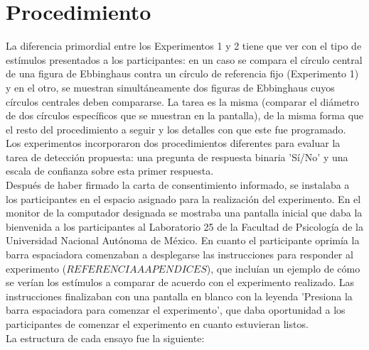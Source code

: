 \section{Procedimiento}

La diferencia primordial entre los Experimentos 1 y 2 tiene que ver con el tipo de estímulos presentados a los participantes: en un caso se compara el círculo central de una figura de Ebbinghaus contra un círculo de referencia fijo (Experimento 1) y en el otro, se muestran simultáneamente dos figuras de Ebbinghaus cuyos círculos centrales deben compararse. La tarea es la misma (comparar el diámetro de dos círculos específicos que se muestran en la pantalla), de la misma forma que el resto del procedimiento a seguir y los detalles con que este fue programado.\\

Los experimentos incorporaron dos procedimientos diferentes para evaluar la tarea de detección propuesta: una pregunta de respuesta binaria 'Sí/No' y una escala de confianza sobre esta primer respuesta.\\

Después de haber firmado la carta de consentimiento informado, se instalaba a los participantes en el espacio asignado para la realización del experimento. En el monitor de la computador designada se mostraba una pantalla inicial que daba la bienvenida a los participantes al Laboratorio 25 de la Facultad de Psicología de la Universidad Nacional Autónoma de México. En cuanto el participante oprimía la barra espaciadora comenzaban a desplegarse las instrucciones para responder al experimento ($REFERENCIA A APENDICES$), que incluían un ejemplo de cómo se verían los estímulos a comparar de acuerdo con el experimento realizado. Las instrucciones finalizaban con una pantalla en blanco con la leyenda 'Presiona la barra espaciadora para comenzar el experimento', que daba oportunidad a los participantes de comenzar el experimento en cuanto estuvieran listos.\\

La estructura de cada ensayo fue la siguiente:\\

